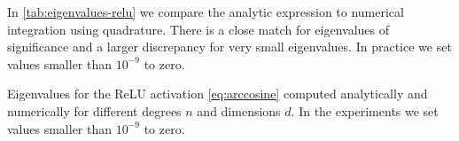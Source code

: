
In \cref{tab:eigenvalues-relu} we compare the analytic expression to numerical integration using quadrature. There is a close match for eigenvalues of significance and a larger discrepancy for very small eigenvalues. In practice we set values smaller than $10^{-9}$ to zero.



\begin{table}[tbh]
    \centering
    \caption{Eigenvalues for the ReLU activation \cref{eq:arccosine}  computed analytically and numerically for different degrees $n$ and dimensions $d$. In the experiments we set values smaller than $10^{-9}$ to zero. \label{tab:eigenvalues-relu}}
    \vspace{.2cm}
    
\end{table}


